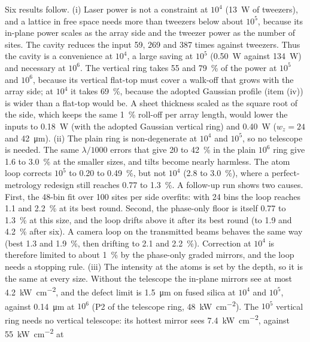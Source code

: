 \documentclass[11pt]{article}
\begin{document}
Six results follow. (i) Laser power is not a constraint at $10^{4}$ (\SI{13}{\watt} of tweezers), and a
lattice in free space needs more than tweezers below about $10^{5}$, because its in-plane power scales as
the array side and the tweezer power as the number of sites. The cavity reduces the input 59, 269 and
387 times against tweezers. Thus the cavity is a convenience at $10^{4}$, a large saving at $10^{5}$
(\SI{0.50}{\watt} against \SI{134}{\watt}) and necessary at $10^{6}$. The vertical ring takes 55 and
\SI{79}{\percent} of the power at $10^{5}$ and $10^{6}$, because its vertical flat-top must cover a walk-off
that grows with the array side; at $10^{4}$ it takes \SI{69}{\percent}, because the adopted Gaussian profile
(item (iv)) is wider than a flat-top would be. A sheet thickness scaled as the square root of the side, which keeps the same \SI{1}{\percent}
roll-off per array length, would lower the inputs to \SI{0.18}{\watt} (with the adopted Gaussian vertical ring) and \SI{0.40}{\watt}
($w_z = 24$ and \SI{42}{\micro\metre}). (ii) The plain ring is non-degenerate at $10^{4}$ and $10^{5}$, so
no telescope is needed. The same $\lambda/1000$ errors that give 20 to \SI{42}{\percent} in the plain
$10^{6}$ ring give 1.6 to \SI{3.0}{\percent} at the smaller sizes, and tilts become nearly harmless. The
atom loop corrects $10^{5}$ to 0.20 to \SI{0.49}{\percent}, but not $10^{4}$ (2.8 to \SI{3.0}{\percent}),
where a perfect-metrology redesign still reaches 0.77 to \SI{1.3}{\percent}. A follow-up run shows two
causes. First, the 48-bin fit over 100 sites per side overfits: with 24 bins the loop reaches 1.1 and
\SI{2.2}{\percent} at its best round. Second, the phase-only floor is itself 0.77 to \SI{1.3}{\percent} at this
size, and the loop drifts above it after its best round (to 1.9 and \SI{4.2}{\percent} after six). A camera loop
on the transmitted beams behaves the same way (best 1.3 and \SI{1.9}{\percent}, then drifting to 2.1 and
\SI{2.2}{\percent}). Correction at $10^{4}$ is therefore limited to about \SI{1}{\percent} by the phase-only
graded mirrors, and the loop needs a stopping rule. (iii) The intensity at the atoms is set by the depth, so it is the same at every size.
Without the telescope the in-plane mirrors see at most \SI{4.2}{\kilo\watt\per\centi\metre\squared}, and the
defect limit is \SI{1.5}{\micro\metre} on fused silica at $10^{4}$ and $10^{5}$, against
\SI{0.14}{\micro\metre} at $10^{6}$ (P2 of the telescope ring, \SI{48}{\kilo\watt\per\centi\metre\squared}). The $10^{5}$ vertical ring needs no vertical telescope: its hottest mirror
sees \SI{7.4}{\kilo\watt\per\centi\metre\squared}, against \SI{55}{\kilo\watt\per\centi\metre\squared} at
\end{document}
